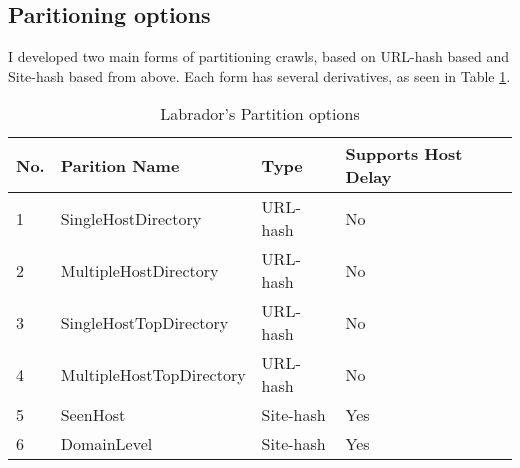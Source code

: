 \subsection{Paritioning options}
I developed two main forms of partitioning crawls, based on URL-hash based and Site-hash based from above. Each form has several derivatives, as seen in Table \ref{tbl-partitions}.\\
\begin{table}
\begin{center}
\begin{tabular}{|l|l|l|l|}
\hline
\hline
\bf{No.}& \bf{Parition Name} & \bf{Type} & \bf{Supports Host Delay} \\
\hline
\hline
1 & SingleHostDirectory & URL-hash & No \\
\hline
2 & MultipleHostDirectory & URL-hash & No \\
\hline
3 & SingleHostTopDirectory & URL-hash & No \\
\hline
4 & MultipleHostTopDirectory & URL-hash & No \\
\hline
\hline
5 & SeenHost & Site-hash  & Yes \\
\hline
6 & DomainLevel & Site-hash & Yes \\
\hline
\end{tabular}
\caption{Labrador's Partition options}\label{tbl-partitions}
\end{center}
\end{table}

